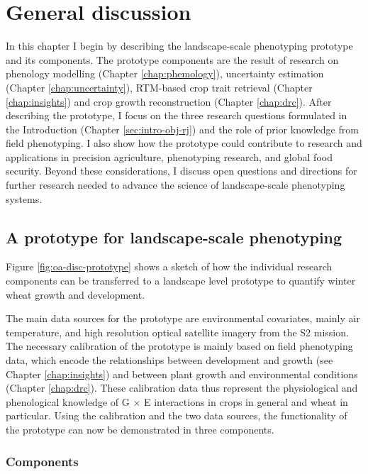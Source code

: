 \chapter{General discussion}
\label{chap:general-discussion}

In this chapter I begin by describing the landscape-scale phenotyping prototype and its components. The prototype components are the result of research on phenology modelling (Chapter \ref{chap:phemology}), uncertainty estimation (Chapter \ref{chap:uncertainty}), \gls{RTM}-based crop trait retrieval (Chapter \ref{chap:insights}) and crop growth reconstruction (Chapter \ref{chap:drc}). After describing the prototype, I focus on the three research questions formulated in the Introduction (Chapter \ref{sec:intro-obj-rj}) and the role of prior knowledge from field phenotyping. I also show how the prototype could contribute to research and applications in precision agriculture, phenotyping research, and global food security. Beyond these considerations, I discuss open questions and directions for further research needed to advance the science of landscape-scale phenotyping systems.

\section{A prototype for landscape-scale phenotyping}
Figure \ref{fig:oa-disc-prototype} shows a sketch of how the individual research components can be transferred to a landscape level prototype to quantify winter wheat growth and development.

The main data sources for the prototype are environmental covariates, mainly air temperature, and high resolution optical satellite imagery from the \gls{S2} mission. The necessary calibration of the prototype is mainly based on field phenotyping data, which encode the relationships between development and growth (see Chapter \ref{chap:insights}) and between plant growth and environmental conditions (Chapter \ref{chap:drc}). These calibration data thus represent the physiological and phenological knowledge of G $\times$ E interactions in crops in general and wheat in particular. Using the calibration and the two data sources, the functionality of the prototype can now be demonstrated in three components.

\subsection{Components}

